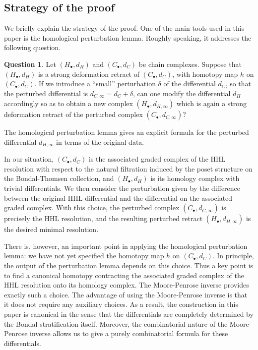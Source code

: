 \documentclass[11pt,reqno]{amsart}
\theoremstyle{definition}
\newtheorem{question}[theorem]{Question}
\numberwithin{equation}{section}
\begin{document}
\smallskip

\subsection{Strategy of the proof}

We briefly explain the strategy of the proof. One of the main tools used in this paper is the homological perturbation lemma. Roughly speaking, it addresses the following question.

\begin{question}
Let $(H_{\bullet},d_H)$ and $(C_{\bullet},d_C)$ be chain complexes. Suppose that $(H_{\bullet},d_H)$ is a strong deformation retract of $(C_{\bullet},d_C)$, with homotopy map $h$ on $(C_{\bullet},d_C)$. If we introduce a ``small'' perturbation $\delta$ of the differential $d_C$, so that the perturbed differential is $d_{C,\infty}=d_C+\delta$, can one modify the differential $d_H$ accordingly so as to obtain a new complex $(H_{\bullet},d_{H,\infty})$ which is again a strong deformation retract of the perturbed complex $(C_{\bullet},d_{C,\infty})$?
\end{question}

\smallskip

The homological perturbation lemma gives an explicit formula for the perturbed differential $d_{H,\infty}$ in terms of the original data.

\smallskip

In our situation, $(C_{\bullet},d_C)$ is the associated graded complex of the HHL resolution with respect to the natural filtration induced by the poset structure on the Bondal-Thomsen collection, and $(H_{\bullet},d_H)$ is its homology complex with trivial differentials. We then consider the perturbation given by the difference between the original HHL differential and the differential on the associated graded complex. With this choice, the perturbed complex $(C_{\bullet},d_{C,\infty})$ is precisely the HHL resolution, and the resulting perturbed retract $(H_{\bullet},d_{H,\infty})$ is the desired minimal resolution.

\smallskip

There is, however, an important point in applying the homological perturbation lemma: we have not yet specified the homotopy map $h$ on $(C_{\bullet},d_C)$. In principle, the output of the perturbation lemma depends on this choice. Thus a key point is to find a canonical homotopy contracting the associated graded complex of the HHL resolution onto its homology complex. The Moore-Penrose inverse provides exactly such a choice. The advantage of using the Moore-Penrose inverse is that it does not require any auxiliary choices. As a result, the construction in this paper is canonical in the sense that the differentials are completely determined by the Bondal stratification itself. Moreover, the combinatorial nature of the Moore-Penrose inverse allows us to give a purely combinatorial formula for these differentials.
\end{document}
